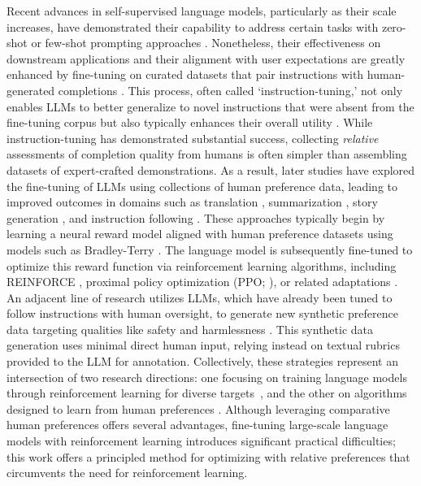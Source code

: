 Recent advances in self-supervised language models, particularly as their scale increases, have demonstrated their capability to address certain tasks with zero-shot \citep{radford2019language} or few-shot prompting approaches \citep{gpt3,megatron,chowdhery2022palm}. Nonetheless, their effectiveness on downstream applications and their alignment with user expectations are greatly enhanced by fine-tuning on curated datasets that pair instructions with human-generated completions \citep{mishra-etal-2022-cross,sanh2022multitask,chung2022scaling,thoppilan2022lamda}. This process, often called `instruction-tuning,' not only enables LLMs to better generalize to novel instructions that were absent from the fine-tuning corpus but also typically enhances their overall utility \citep{chung2022scaling}. While instruction-tuning has demonstrated substantial success, collecting \textit{relative} assessments of completion quality from humans is often simpler than assembling datasets of expert-crafted demonstrations. As a result, later studies have explored the fine-tuning of LLMs using collections of human preference data, leading to improved outcomes in domains such as translation \citep{kreutzer-etal-2018-reliability}, summarization \citep{stiennon2022learning,ziegler2020finetuning}, story generation \citep{ziegler2020finetuning}, and instruction following \citep{ouyang2022training,ramamurthy2023is}. These approaches typically begin by learning a neural reward model aligned with human preference datasets using models such as Bradley-Terry \citep{bradley1952rankanalysis}. The language model is subsequently fine-tuned to optimize this reward function via reinforcement learning algorithms, including REINFORCE \citep{williams1992reinforce}, proximal policy optimization (PPO; \cite{schulman2017proximal}), or related adaptations \citep{ramamurthy2023is}. An adjacent line of research utilizes LLMs, which have already been tuned to follow instructions with human oversight, to generate new synthetic preference data targeting qualities like safety and harmlessness \citep{bai2022constitutional}. This synthetic data generation uses minimal direct human input, relying instead on textual rubrics provided to the LLM for annotation. Collectively, these strategies represent an intersection of two research directions: one focusing on training language models through reinforcement learning for diverse targets~\citep{Ranzato2015SequenceLT,paulus2018a,wu2018learning}, and the other on algorithms designed to learn from human preferences \citep{christiano2017deep,kupcsik2018learning}. Although leveraging comparative human preferences offers several advantages, fine-tuning large-scale language models with reinforcement learning introduces significant practical difficulties; this work offers a principled method for optimizing with relative preferences that circumvents the need for reinforcement learning.

